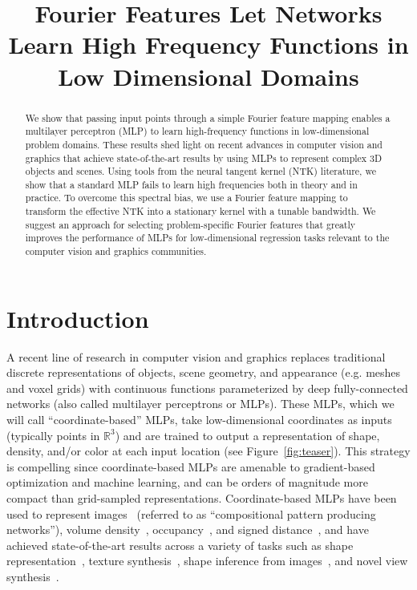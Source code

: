 \title{Fourier Features Let Networks Learn High Frequency Functions in Low Dimensional Domains}

\begin{abstract}
We show that passing input points through a simple Fourier feature mapping enables a multilayer perceptron (MLP) to learn high-frequency functions in low-dimensional problem domains. These results shed light on recent advances in computer vision and graphics that achieve state-of-the-art results by using MLPs to represent complex 3D objects and scenes. Using tools from the neural tangent kernel (NTK) literature, we show that a standard MLP fails to learn high frequencies both in theory and in practice. To overcome this spectral bias, we use a Fourier feature mapping to transform the effective NTK into a stationary kernel with a tunable bandwidth. We suggest an approach for selecting problem-specific Fourier features that greatly improves the performance of MLPs for low-dimensional regression tasks relevant to the computer vision and graphics communities.
\end{abstract}

\section{Introduction}

A recent line of research in computer vision and graphics replaces traditional discrete representations of objects, scene geometry, and appearance (e.g. meshes and voxel grids) with continuous functions parameterized by deep fully-connected networks (also called multilayer perceptrons or MLPs). These MLPs, which we will call ``coordinate-based'' MLPs, take low-dimensional coordinates as inputs (typically points in $\mathbb{R}^3$) and are trained to output a representation of shape, density, and/or color at each input location (see Figure~\ref{fig:teaser}). 
This strategy is compelling since coordinate-based MLPs are amenable to gradient-based optimization and machine learning, and can be orders of magnitude more compact than grid-sampled representations. Coordinate-based MLPs have been used to represent images~\cite{nguyen2015deep,stanley2007compositional} (referred to as ``compositional pattern producing networks''), volume density~\cite{mildenhall2020nerf}, occupancy~\cite{occupancynet}, and signed distance~\cite{deepsdf}, and have achieved state-of-the-art results across a variety of tasks such as shape representation~\cite{implicitfields,neuralarticulated,learningshape,localdeep,localimplicit,implicitlayers,deepsdf}, texture synthesis~\cite{henzler2020neuraltexture,texturefields}, shape inference from images~\cite{dist,implicitwithout3d}, and novel view synthesis~\cite{mildenhall2020nerf,diffvolumetric,pifu,srn}.

